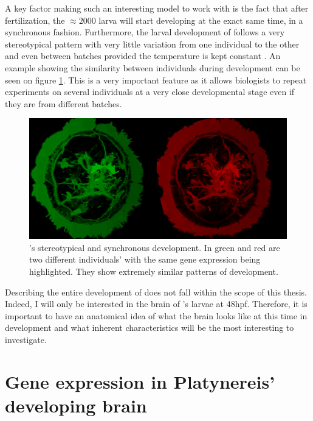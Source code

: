     A key factor making \platy{} such an interesting model to work with is the fact that after fertilization, the $\approx 2000$ larva will start developing at the exact same time, in a synchronous fashion. Furthermore, the larval development of \platy{} follows a very stereotypical pattern with very little variation from one individual to the other and even between batches provided the temperature is kept constant \cite{fischer04,dorresteijn90}. An example showing the similarity between individuals during development can be seen on figure \ref{fig:brain_comparison}. This is a very important feature as it allows biologists to repeat experiments on several individuals at a very close developmental stage even if they are from different batches.\\
    
\begin{figure}[bth]
  \includegraphics[width=\linewidth]{gfx/chapter1/brain_comparison.png}
  \caption{\platyfull{}'s stereotypical and synchronous development. In green and red are two different \platy{} individuals' with the same gene expression being highlighted. They show extremely similar patterns of development.}
  \label{fig:brain_comparison}
\end{figure}

	 Describing the entire development of \platy{} does not fall within the scope of this thesis. Indeed, I will only be interested in the brain of \platy{}'s larvae at 48hpf. Therefore, it is important to have an anatomical idea of what the brain looks like at this time in development and what inherent characteristics will be the most interesting to investigate.

\section{Gene expression in Platynereis' developing brain}\label{sec:gene_expression_background}
